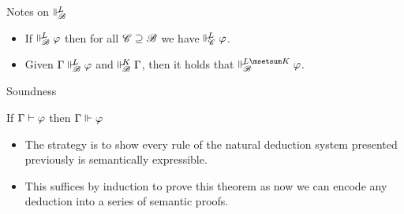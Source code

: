 \documentclass{beamer}
\begin{document}
\begin{frame}{Notes on $\Vdash_{ \!\!\mathscr{B} }^{ \!\!{L} }$}
\begin{itemize}
	\item If $\Vdash_{ \!\!\mathscr{B} }^{ \!\!L }\varphi$ then for all $\mathscr{C} \supseteq \mathscr{B}$ we have $\Vdash_{ \!\!\mathscr{C} }^{ \!\!L }\varphi$.
	\vspace{5pt}
	\item Given $\Gamma\Vdash_{ \!\!\mathscr{B} }^{ \!\!L }\varphi$ and $\Vdash_{ \!\!\mathscr{B} }^{ \!\!K }\Gamma$, then it holds that $\suppM{\baseB}{L\msetsum K}\varphi$.
\end{itemize}
\end{frame}
\begin{frame}{Soundness}
	\begin{theorem}[Soundness]
		\centering
		If $\Gamma\vdash\varphi$ then $\Gamma\Vdash_{ \!\! }^{ \!\! }\varphi$
	\end{theorem}
	\pause
	\begin{itemize}
		\item The strategy is to show every rule of the natural deduction system presented previously is semantically expressible.
		\item This suffices by induction to prove this theorem as now we can encode any deduction into a series of semantic proofs.
	\end{itemize}
\end{frame}
\end{document}

